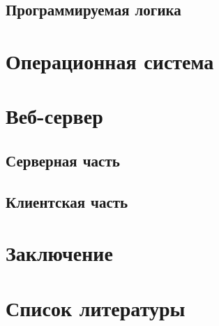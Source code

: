 \documentclass[a4paper, 14pt]{extarticle}
\begin{document}
    \subsection{Программируемая логика}
    

\section{Операционная система}

\section{Веб-сервер}
    \subsection{Серверная часть}
    
    \subsection{Клиентская часть}
    

\section{Заключение}

\section{Список литературы}
\end{document}
